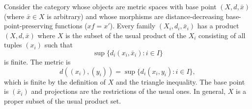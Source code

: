 Consider the category whose objects are metric spaces with base point $(X, d, \bar{x})$ (where $\bar{x} \in X$ is arbitrary) and whose morphisms are distance-decreasing base-point-preserving functions ($xf = x'$). Every family $(X_i, d_i, \bar{x}_i)$ has a product $(X, d, \bar{x})$ where $X$ is the subset of the usual product of the $X_i$ consisting of all tuples $(x_i)$ such that
$$\sup\{d_i(x_i, \bar{x}_i) : i \in I\}$$
is finite. The metric is
$$d((x_i), (y_i)) = \sup\{d_i(x_i, y_i) : i \in I\},$$
which is finite by the definition of $X$ and the triangle inequality. The base point is $(\bar{x}_i)$ and projections are the restrictions of the usual ones. In general, $X$ is a proper subset of the usual product set.
